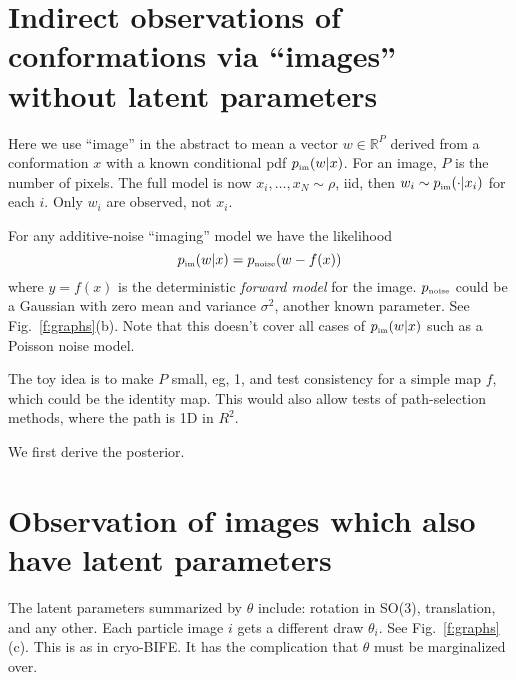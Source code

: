 \documentclass[10pt]{article}
\newcommand{\tbox}[1]{{\mbox{\tiny #1}}}
\newcommand{\R}{\mathbb{R}}
\begin{document}
\section{Indirect observations of conformations via ``images'' without
latent parameters}

Here we use ``image'' in the abstract to mean a vector
$w\in \R^P$ derived from a conformation $x$ with a known conditional
pdf $p_\tbox{im}(w|x)$.
For an image, $P$ is the number of pixels.
The full model is now $x_i,\dots,x_N \sim \rho$, iid, then
$w_i \sim p_\tbox{im}(\cdot | x_i)$ for each $i$.
Only $w_i$ are observed, not $x_i$.

For any additive-noise ``imaging'' model we have the likelihood
$$
p_\tbox{im}(w | x) = p_\tbox{noise}(w - f(x))
$$
where $y=f(x)$ is the deterministic {\em forward model} for the image.
$p_\tbox{noise}$ could be a Gaussian with zero mean and variance $\sigma^2$,
another known parameter.
See Fig.~\ref{f:graphs}(b).
Note that this doesn't cover all cases of $p_\tbox{im}(w|x)$ such as a Poisson noise
model.

The toy idea is to make $P$ small, eg, 1, and test
consistency for a simple map $f$, which could be the identity map.
This would also allow tests of path-selection methods, where
the path is 1D in $R^2$.

We first derive the posterior.






\section{Observation of images which also have latent parameters}

The latent parameters summarized by $\theta$ include:
rotation in SO(3), translation, and any other.
Each particle image $i$ gets a different draw $\theta_i$.
See Fig.~\ref{f:graphs}(c).
This is as in cryo-BIFE.
It has the complication that $\theta$ must be marginalized over.








\end{document}

